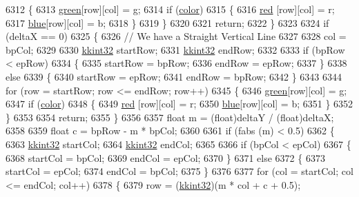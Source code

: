 \begin{DoxyCode}
6312     \{
6313       \hyperlink{class_k_k_b_1_1_raster_a2d2238911145488e226cd2e34fc8448c}{green}[row][col] = g;
6314       \textcolor{keywordflow}{if}  (\hyperlink{class_k_k_b_1_1_raster_a482384d89cc53fa4f36276307c746854}{color})
6315       \{
6316         \hyperlink{class_k_k_b_1_1_raster_a7fd39e0463c8477d0d0d26e11126d285}{red} [row][col] = r;
6317         \hyperlink{class_k_k_b_1_1_raster_a0265be7ea30f5b1f9d6310a79bee868b}{blue}[row][col] = b;
6318       \}
6319     \}
6320 
6321     \textcolor{keywordflow}{return};
6322   \}
6323 
6324   \textcolor{keywordflow}{if}  (deltaX == 0)
6325   \{
6326     \textcolor{comment}{// We have a Straight Vertical Line}
6327 
6328     col = bpCol;
6329     
6330     \hyperlink{namespace_k_k_b_a8fa4952cc84fda1de4bec1fbdd8d5b1b}{kkint32}  startRow;
6331     \hyperlink{namespace_k_k_b_a8fa4952cc84fda1de4bec1fbdd8d5b1b}{kkint32}  endRow;
6332 
6333     \textcolor{keywordflow}{if}  (bpRow < epRow)
6334     \{
6335       startRow = bpRow;
6336       endRow   = epRow;
6337     \}
6338     \textcolor{keywordflow}{else}
6339     \{
6340       startRow = epRow;
6341       endRow   = bpRow;
6342     \}
6343 
6344     \textcolor{keywordflow}{for}  (row = startRow;  row <= endRow;  row++)
6345     \{
6346       \hyperlink{class_k_k_b_1_1_raster_a2d2238911145488e226cd2e34fc8448c}{green}[row][col] = g;
6347       \textcolor{keywordflow}{if}  (\hyperlink{class_k_k_b_1_1_raster_a482384d89cc53fa4f36276307c746854}{color})
6348       \{
6349         \hyperlink{class_k_k_b_1_1_raster_a7fd39e0463c8477d0d0d26e11126d285}{red} [row][col] = r;
6350         \hyperlink{class_k_k_b_1_1_raster_a0265be7ea30f5b1f9d6310a79bee868b}{blue}[row][col] = b;
6351       \}
6352     \}
6353 
6354     \textcolor{keywordflow}{return};
6355   \}
6356 
6357   \textcolor{keywordtype}{float}  m = (float)deltaY / (\textcolor{keywordtype}{float})deltaX;
6358 
6359   \textcolor{keywordtype}{float}  c = bpRow - m * bpCol;
6360 
6361   \textcolor{keywordflow}{if}  (fabs (m) < 0.5)
6362   \{
6363     \hyperlink{namespace_k_k_b_a8fa4952cc84fda1de4bec1fbdd8d5b1b}{kkint32}  startCol;
6364     \hyperlink{namespace_k_k_b_a8fa4952cc84fda1de4bec1fbdd8d5b1b}{kkint32}  endCol;
6365 
6366     \textcolor{keywordflow}{if}  (bpCol < epCol)
6367     \{
6368       startCol = bpCol;
6369       endCol   = epCol;
6370     \}
6371     \textcolor{keywordflow}{else}
6372     \{
6373       startCol = epCol;
6374       endCol   = bpCol;
6375     \}
6376 
6377     \textcolor{keywordflow}{for}  (col = startCol;  col <= endCol;  col++)
6378     \{
6379       row = (\hyperlink{namespace_k_k_b_a8fa4952cc84fda1de4bec1fbdd8d5b1b}{kkint32})(m * col + c + 0.5);

\end{DoxyCode}
